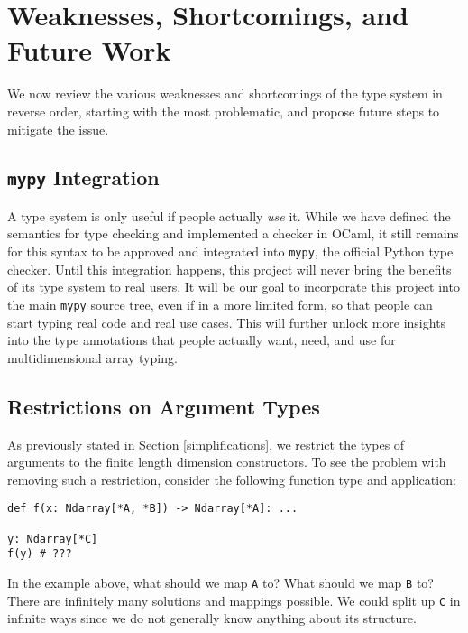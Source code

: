 \documentclass{report}
\begin{document}
\section{Weaknesses, Shortcomings, and Future Work}

We now review the various weaknesses and shortcomings of the type system in reverse order, starting with the most problematic, and propose future steps to mitigate the issue.

\subsection{\texttt{mypy} Integration}

A type system is only useful if people actually \textit{use} it. While we have defined the semantics for type checking and implemented a checker in OCaml, it still remains for this syntax to be approved and integrated into \texttt{mypy}, the official Python type checker. Until this integration happens, this project will never bring the benefits of its type system to real users. It will be our goal to incorporate this project into the main \texttt{mypy} source tree, even if in a more limited form, so that people can start typing real code and real use cases. This will further unlock more insights into the type annotations that people actually want, need, and use for multidimensional array typing.

\subsection{Restrictions on Argument Types}

As previously stated in Section \ref{simplifications}, we restrict the types of arguments to the finite length dimension constructors. To see the problem with removing such a restriction, consider the following function type and application:

\begin{singlespace*}
    \begin{verbatim}
def f(x: Ndarray[*A, *B]) -> Ndarray[*A]: ...

y: Ndarray[*C]
f(y) # ???\end{verbatim}
\end{singlespace*}
In the example above, what should we map \texttt{A} to? What should we map \texttt{B} to? There are infinitely many solutions and mappings possible. We could split up \texttt{C} in infinite ways since we do not generally know anything about its structure.
\end{document}
